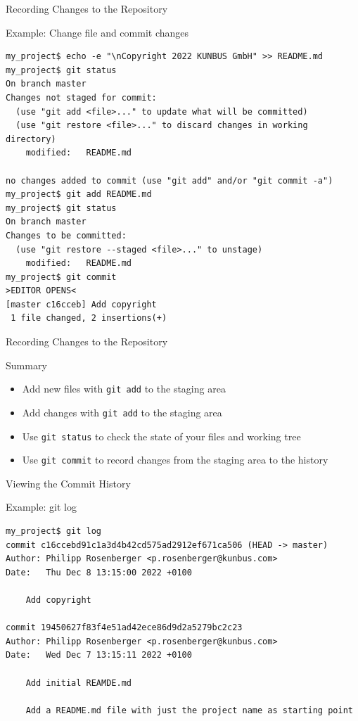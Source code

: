 \documentclass[aspectratio=169]{beamer}
\renewcommand{\footnotesize}{\tiny}
\newcommand{\sectiontitle}{}
\begin{document}
\begin{frame}[fragile]{Recording Changes to the Repository}{\sectiontitle}
\begin{block}{Example: Change file and commit changes}
\begin{verbatim}
my_project$ echo -e "\nCopyright 2022 KUNBUS GmbH" >> README.md
my_project$ git status
On branch master
Changes not staged for commit:
  (use "git add <file>..." to update what will be committed)
  (use "git restore <file>..." to discard changes in working directory)
    modified:   README.md

no changes added to commit (use "git add" and/or "git commit -a")
my_project$ git add README.md
my_project$ git status 
On branch master
Changes to be committed:
  (use "git restore --staged <file>..." to unstage)
    modified:   README.md
my_project$ git commit
>EDITOR OPENS<
[master c16cceb] Add copyright
 1 file changed, 2 insertions(+)
\end{verbatim}
\end{block}
\end{frame}

\begin{frame}[fragile]{Recording Changes to the Repository}{\sectiontitle}
\begin{block}{Summary}
\begin{itemize}
    \item Add new files with \verb|git add| to the staging area
    \item Add changes with \verb|git add| to the staging area
    \item Use \verb|git status| to check the state of your files and working tree
    \item Use \verb|git commit| to record changes from the staging area to the history
\end{itemize}
\end{block}
\end{frame}

\begin{frame}[fragile]{Viewing the Commit History}{\sectiontitle}
\begin{block}{Example: \ttfamily git log}
\begin{verbatim}
my_project$ git log
commit c16ccebd91c1a3d4b42cd575ad2912ef671ca506 (HEAD -> master)
Author: Philipp Rosenberger <p.rosenberger@kunbus.com>
Date:   Thu Dec 8 13:15:00 2022 +0100

    Add copyright

commit 19450627f83f4e51ad42ece86d9d2a5279bc2c23
Author: Philipp Rosenberger <p.rosenberger@kunbus.com>
Date:   Wed Dec 7 13:15:11 2022 +0100

    Add initial REAMDE.md
    
    Add a README.md file with just the project name as starting point

\end{verbatim}
\end{block}
\end{frame}
\end{document}
